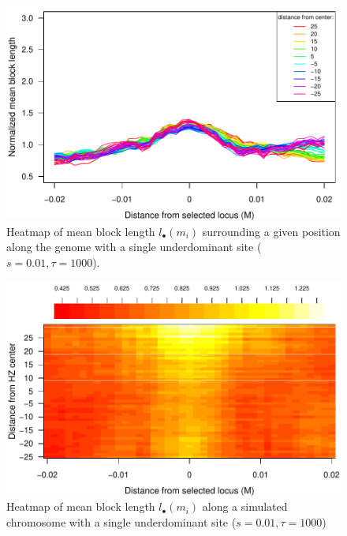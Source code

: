 \documentclass[12pt,titlepage]{article}
\begin{document}
\begin{figure}
\includegraphics{figs/blocksAlongChromNoConditioning}
\caption{Heatmap of mean block length $l_\bullet(m_i)$ surrounding a given position along the genome with a single underdominant site ($s=0.01, \tau=1000$). }\label{Supp:blockLengthNoAnc}
\end{figure}

\begin{figure}
\includegraphics{figs/blocksAlongChromHeatmap}
\caption{Heatmap of mean block length $l_\bullet(m_i)$ along a simulated chromosome with a single underdominant site ($s=0.01, \tau=1000$) }\label{Supp:blockLengthHeatmapNoAnc}
\end{figure}
\end{document}
